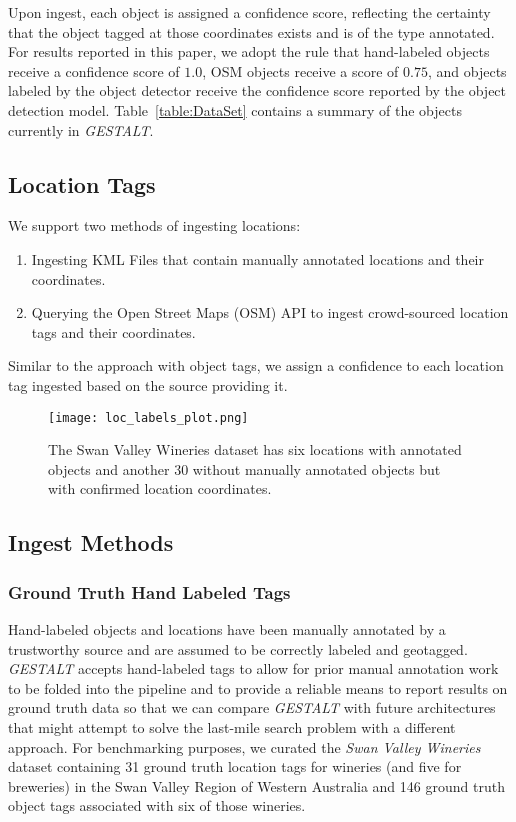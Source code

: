 Upon ingest, each object is assigned a confidence score, reflecting the certainty that the object tagged at those coordinates exists and is of the type annotated. 
For results reported in this paper, we adopt the rule that hand-labeled objects receive a confidence score of $1.0$, OSM objects receive a score of $0.75$, and objects labeled by the object detector receive the confidence score reported by the object detection model. Table~\ref{table:DataSet} contains a summary of the objects currently in \emph{GESTALT}.

\subsection{Location Tags}
We support two methods of ingesting locations:
\begin{enumerate}
    \item Ingesting KML Files that contain manually annotated locations and their coordinates.
    \item Querying the Open Street Maps (OSM) API to ingest crowd-sourced location tags and their coordinates. 
\end{enumerate}

Similar to the approach with object tags, we assign a confidence to each location tag ingested based on the source providing it.



\begin{figure}[h!]       
    \texttt{[image: loc\_labels\_plot.png]}
    \caption{The Swan Valley Wineries dataset has six locations with annotated objects and another 30 without manually annotated objects but with confirmed location coordinates.}
    \label{fig:loc} 
\end{figure}


\subsection{Ingest Methods}
\subsubsection{Ground Truth Hand Labeled Tags} 
Hand-labeled objects and locations have been manually annotated by a trustworthy source and are assumed to be correctly labeled and geotagged. 
\emph{GESTALT} accepts hand-labeled tags to allow for prior manual annotation work to be folded into the pipeline and to provide a reliable means to report results on ground truth data so that we can compare \emph{GESTALT} with future architectures that might attempt to solve the last-mile search problem with a different approach. 
For benchmarking purposes, we curated the \emph{Swan Valley Wineries} dataset containing 31 ground truth location tags for wineries (and five for breweries) in the Swan Valley Region of Western Australia and 146 ground truth object tags associated with six of those wineries. 

